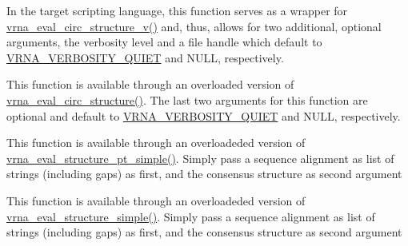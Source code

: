 \begin{DoxyRefList}
\item[\label{wrappers__wrappers000042}%
\Hypertarget{wrappers__wrappers000042}%
Global \hyperlink{group__eval_ga3e05a23ddf9b083f4e69881e440d4866}{vrna\+\_\+eval\+\_\+circ\+\_\+structure} (const char $\ast$string, const char $\ast$structure)]In the target scripting language, this function serves as a wrapper for \hyperlink{group__eval_gac3fb44e0773a51be8efc5f4f595a94a7}{vrna\+\_\+eval\+\_\+circ\+\_\+structure\+\_\+v()} and, thus, allows for two additional, optional arguments, the verbosity level and a file handle which default to \hyperlink{group__eval_gaf4afe19780b61b4962c613bde324128b}{V\+R\+N\+A\+\_\+\+V\+E\+R\+B\+O\+S\+I\+T\+Y\+\_\+\+Q\+U\+I\+ET} and N\+U\+LL, respectively.  
\item[\label{wrappers__wrappers000052}%
\Hypertarget{wrappers__wrappers000052}%
Global \hyperlink{group__eval_gac3fb44e0773a51be8efc5f4f595a94a7}{vrna\+\_\+eval\+\_\+circ\+\_\+structure\+\_\+v} (const char $\ast$string, const char $\ast$structure, int verbosity\+\_\+level, F\+I\+LE $\ast$file)]This function is available through an overloaded version of \hyperlink{group__eval_ga3e05a23ddf9b083f4e69881e440d4866}{vrna\+\_\+eval\+\_\+circ\+\_\+structure()}. The last two arguments for this function are optional and default to \hyperlink{group__eval_gaf4afe19780b61b4962c613bde324128b}{V\+R\+N\+A\+\_\+\+V\+E\+R\+B\+O\+S\+I\+T\+Y\+\_\+\+Q\+U\+I\+ET} and N\+U\+LL, respectively.  
\item[\label{wrappers__wrappers000060}%
\Hypertarget{wrappers__wrappers000060}%
Global \hyperlink{group__eval_gabbb4d2a7aa324ec9cce8f47ce61ab8af}{vrna\+\_\+eval\+\_\+consensus\+\_\+structure\+\_\+pt\+\_\+simple} (const char $\ast$$\ast$alignment, const short $\ast$pt)]This function is available through an overloadeded version of \hyperlink{group__eval_ga0bba59b4d6e53461088666ff4aece7b0}{vrna\+\_\+eval\+\_\+structure\+\_\+pt\+\_\+simple()}. Simply pass a sequence alignment as list of strings (including gaps) as first, and the consensus structure as second argument  
\item[\label{wrappers__wrappers000045}%
\Hypertarget{wrappers__wrappers000045}%
Global \hyperlink{group__eval_ga7762c3a7bdcbc3a14ef93259d322c7d6}{vrna\+\_\+eval\+\_\+consensus\+\_\+structure\+\_\+simple} (const char $\ast$$\ast$alignment, const char $\ast$structure)]This function is available through an overloadeded version of \hyperlink{group__eval_ga7e5273464b775d4130245681312c1369}{vrna\+\_\+eval\+\_\+structure\+\_\+simple()}. Simply pass a sequence alignment as list of strings (including gaps) as first, and the consensus structure as second argument  

\end{DoxyRefList}
